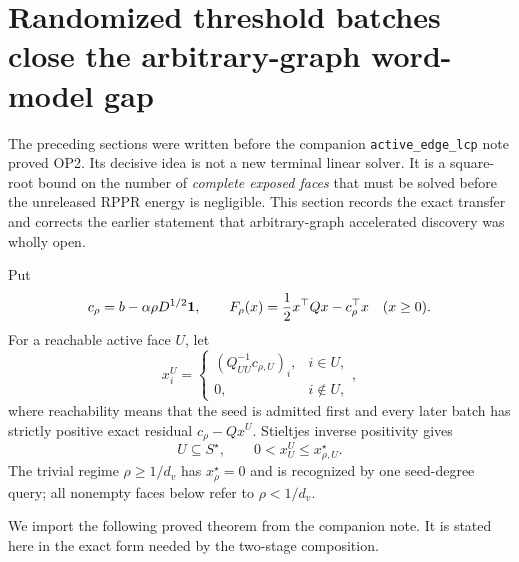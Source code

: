 \section{Randomized threshold batches close the arbitrary-graph word-model gap}
\label{sec:two-stage-randomized-op2}

The preceding sections were written before the companion
\texttt{active\_edge\_lcp} note proved OP2.  Its decisive idea is not a new
terminal linear solver.  It is a square-root bound on the number of
\emph{complete exposed faces} that must be solved before the unreleased RPPR
energy is negligible.  This section records the exact transfer and corrects
the earlier statement that arbitrary-graph accelerated discovery was wholly
open.

Put
\begin{equation*}
 c_\rho=b-\alpha\rho D^{1/2}\mathbf{1},
 \qquad
 F_\rho(x)=\frac12x^\top Qx-c_\rho^\top x
 \quad(x\geq0).
\end{equation*}
For a reachable active face $U$, let
\begin{equation}
 x_i^U=
 \begin{cases}
  (Q_{UU}^{-1}c_{\rho,U})_i,&i\in U,\\
  0,&i\notin U,
 \end{cases},
 \label{eq:two-stage-random-face}
\end{equation}
where reachability means that the seed is admitted first and every later
batch has strictly positive exact residual $c_\rho-Qx^U$.  Stieltjes inverse
positivity gives
\begin{equation}
 U\subseteq S^\star,
 \qquad
 0<x_U^U\leq x_{\rho,U}^\star.
 \label{eq:two-stage-random-safe-face}
\end{equation}
The trivial regime $\rho\geq1/d_v$ has $x_\rho^\star=0$ and is recognized by
one seed-degree query; all nonempty faces below refer to $\rho<1/d_v$.

We import the following proved theorem from the companion note.  It is stated
here in the exact form needed by the two-stage composition.

